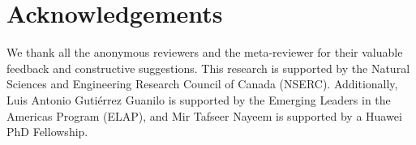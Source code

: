 \section*{Acknowledgements}

We thank all the anonymous reviewers and the meta-reviewer for their valuable feedback and constructive suggestions. 
This research is supported by the Natural Sciences and Engineering Research Council of Canada (NSERC). Additionally, Luis Antonio Gutiérrez Guanilo is supported by the Emerging Leaders in the Americas Program (ELAP), and Mir Tafseer Nayeem is supported by a Huawei PhD Fellowship.